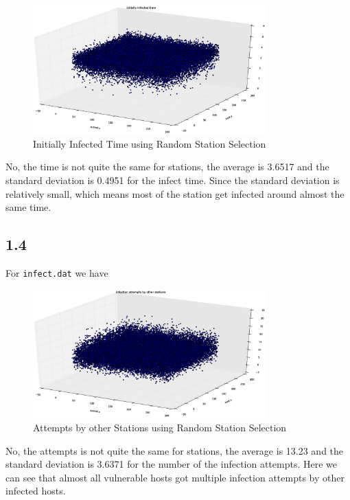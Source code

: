 \documentclass[10pt]{article}
\begin{document}
\begin{figure}[H]
\begin{center}
\includegraphics[width=0.8\textwidth]{figure1.3.eps}
\caption{Initially Infected Time using Random Station Selection}
\end{center}
\end{figure}

No, the time is not quite the same for stations, the average is 3.6517 and the standard deviation is 0.4951 for the infect time. Since the standard deviation is relatively small, which means most of the station get infected around almost the same time.


\subsection*{1.4}
For \texttt{infect.dat} we have

\begin{figure}[H]
\begin{center}
\includegraphics[width=0.8\textwidth]{figure1.4.eps}
\caption{Attempts by other Stations using Random Station Selection}
\end{center}
\end{figure}

No, the attempts is not quite the same for stations, the average is 13.23 and the standard deviation is 3.6371 for the number of the infection attempts. Here we can see that almost all vulnerable hosts got multiple infection attempts by other infected hosts.
\end{document}

